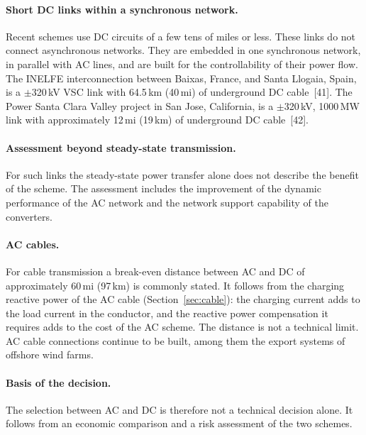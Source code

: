 \paragraph{Short DC links within a synchronous network.} Recent schemes use
DC circuits of a few tens of miles or less. These links do not connect
asynchronous networks. They are embedded in one synchronous network, in
parallel with AC lines, and are built for the controllability of their power
flow. The INELFE interconnection between Baixas, France, and Santa Llogaia,
Spain, is a $\pm$320\,kV VSC link with 64.5\,km (40\,mi) of underground DC
cable~[41]. The Power Santa Clara Valley project in San Jose, California, is
a $\pm$320\,kV, 1000\,MW link with approximately 12\,mi (19\,km) of
underground DC cable~[42].

\paragraph{Assessment beyond steady-state transmission.} For such links the
steady-state power transfer alone does not describe the benefit of the
scheme. The assessment includes the improvement of the dynamic performance
of the AC network and the network support capability of the converters.

\paragraph{AC cables.} For cable transmission a break-even distance between
AC and DC of approximately 60\,mi (97\,km) is commonly stated. It follows
from the charging reactive power of the AC cable
(Section~\ref{sec:cable}): the charging current adds to the load current in
the conductor, and the reactive power compensation it requires adds to the
cost of the AC scheme. The distance is not a technical limit. AC cable
connections continue to be built, among them the export systems of offshore
wind farms.

\paragraph{Basis of the decision.} The selection between AC and DC is
therefore not a technical decision alone. It follows from an economic
comparison and a risk assessment of the two schemes.

\FloatBarrier
